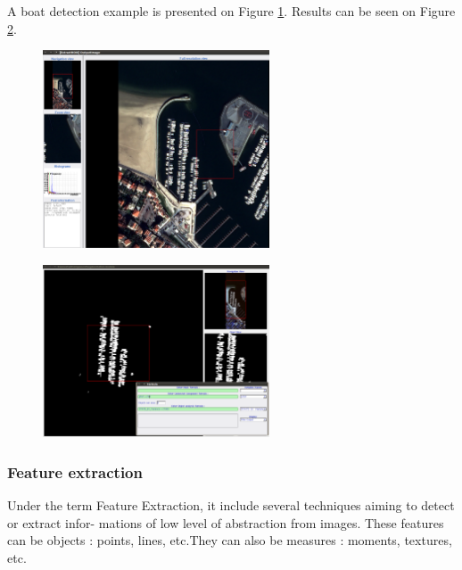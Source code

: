 A boat detection example is presented on Figure \ref{fig:boat detection}. Results can be seen on Figure \ref{fig:boat detection result}. 

\begin{figure}
  \center
  \includegraphics[width=0.6\textwidth]{../Art/MonteverdiImages/monteverdi_Capture_Boats.png}
  \label{fig:boat detection}
\end{figure}

\begin{figure}
  \center
  \includegraphics[width=0.6\textwidth]{../Art/MonteverdiImages/monteverdi_Capture_Boats_CC.png}
  \label{fig:boat detection result}
\end{figure}




\subsubsection{Feature extraction}

Under the term Feature Extraction, it include several techniques
aiming to detect or extract infor- mations of low level of abstraction
from images. These features can be objects : points, lines, etc.They
can also be measures : moments, textures, etc.

